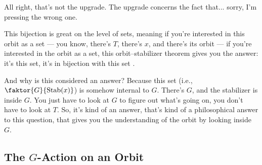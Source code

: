 \begin{speech}[00:04:46 - 00:05:39]
All right, that's not the upgrade. The upgrade concerns the fact that... sorry, I'm pressing the wrong one.

This bijection is great on the level of sets, meaning if you're interested in this orbit as a set --- you know, there's $T$, there's $x$, and there's its orbit  --- if you're interested in the orbit as a set, this orbit--stabilizer theorem gives you the answer: it's this set, it's in bijection with this set .

And why is this considered an answer? Because this set (i.e., $\faktor{G}{\operatorname{Stab}(x)}$) is somehow internal to $G$. There's $G$, and the stabilizer is inside $G$. You just have to look at $G$ to figure out what's going on, you don't have to look at $T$. So, it's kind of an answer, that's kind of a philosophical answer to this question, that gives you the understanding of the orbit by looking inside $G$.
\end{speech}

\begin{hidden}
\end{hidden}

\subsection{The \texorpdfstring{$G$}{G}-Action on an Orbit}

